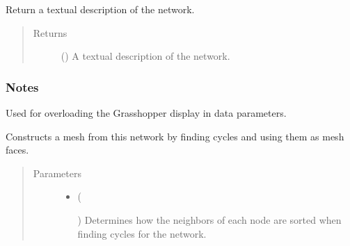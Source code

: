 \documentclass[letterpaper,10pt,english]{sphinxmanual}
\begin{document}
\begin{fulllineitems}
\begin{fulllineitems}
\label{\detokenize{cockatoo:cockatoo.KnitDiNetwork.ToString}}
Return a textual description of the network.
\begin{quote}\begin{description}
\item[{Returns}] \leavevmode
{} () \textendash{} A textual description of the network.

\end{description}\end{quote}
\subsubsection*{Notes}

Used for overloading the Grasshopper display in data parameters.

\end{fulllineitems}


\begin{fulllineitems}
\label{\detokenize{cockatoo:cockatoo.KnitDiNetwork.create_mesh}}
Constructs a mesh from this network by finding cycles and using them as
mesh faces.
\begin{quote}\begin{description}
\item[{Parameters}] \leavevmode\begin{itemize}
\item {} 
 (%
\begin{footnote}[141]\sphinxAtStartFootnote
{}
%
\end{footnote}\sphinxstyleliteralemphasis{\sphinxupquote{, }}) \textendash{} 
Determines how the neighbors of each node are sorted when finding
cycles for the network.


\end{itemize}
\end{description}
\end{quote}
\end{fulllineitems}
\end{fulllineitems}
\end{document}
